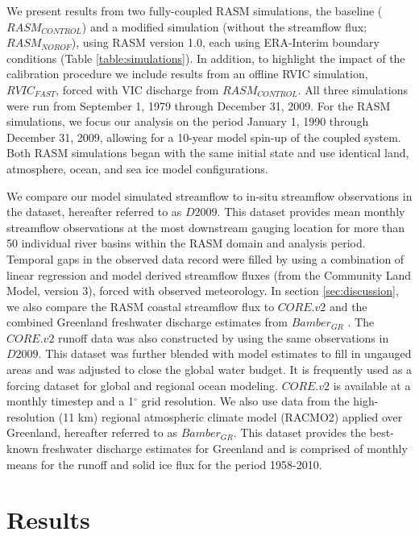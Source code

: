 \documentclass[jgrga, draft]{agutex}
\begin{document}
\begin{article}
We present results from two fully-coupled RASM simulations, the baseline ($RASM_{CONTROL}$) and a modified simulation (without the streamflow flux; $RASM_{NOROF}$), using RASM version 1.0, each using ERA-Interim boundary conditions (Table \ref{table:simulations}).
In addition, to highlight the impact of the calibration procedure we include results from an offline RVIC simulation, $RVIC_{FAST}$, forced with VIC discharge from $RASM_{CONTROL}$.
All three simulations were run from September 1, 1979 through December 31, 2009.
For the RASM simulations, we focus our analysis on the period January 1, 1990 through December 31, 2009, allowing for a 10-year model spin-up of the coupled system.
Both RASM simulations began with the same initial state \citep[see ][]{Hamman_2016} and use identical land, atmosphere, ocean, and sea ice model configurations.

We compare our model simulated streamflow to in-situ streamflow observations in the \citet{Dai_2009} dataset, hereafter referred to as $D2009$.
This dataset provides mean monthly streamflow observations at the most downstream gauging location for more than 50 individual river basins within the RASM domain and analysis period.
Temporal gaps in the observed data record were filled by \citet{Dai_2009} using a combination of linear regression and model derived streamflow fluxes (from the Community Land Model, version 3), forced with observed meteorology.
In section \ref{sec:discussion}, we also compare the RASM coastal streamflow flux to $CORE.v2$ \citep{Large_2009} and the combined Greenland freshwater discharge estimates from $Bamber_{GR}$ \citep{Bamber_2012}.
The $CORE.v2$ runoff data was also constructed by \citet{Dai_2009} using the same observations in $D2009$.
This dataset was further blended with model estimates to fill in ungauged areas and was adjusted to close the global water budget.
It is frequently used as a forcing dataset for global and regional ocean modeling.
$CORE.v2$ is available at a monthly timestep and a 1$^{\circ}$ grid resolution.
We also use data from the high-resolution (11 km) regional atmospheric climate model (RACMO2) applied over Greenland, hereafter referred to as $Bamber_{GR}$.
This dataset provides the best-known freshwater discharge estimates for Greenland and is comprised of monthly means for the runoff and solid ice flux for the period 1958-2010.

\section{Results}
\label{sec:results}


\end{article}
\end{document}
